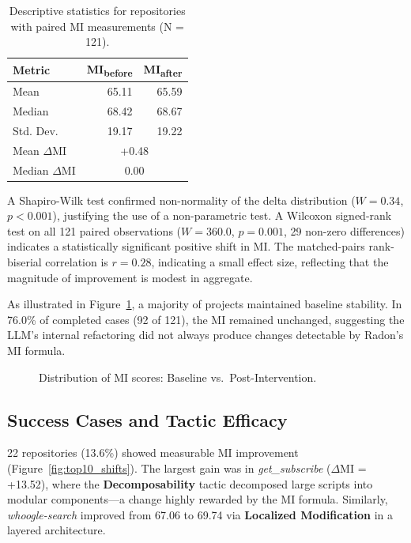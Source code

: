 \documentclass[sigconf,review,anonymous]{acmart}
\begin{document}
\begin{table}[htbp]
\caption{Descriptive statistics for repositories with paired MI measurements (N = 121).}
\label{tab:descriptive}
\centering
\small
\begin{tabular}{lrr}
\toprule
\textbf{Metric} & \textbf{MI\textsubscript{before}} & \textbf{MI\textsubscript{after}} \\
\midrule
Mean & 65.11 & 65.59 \\
Median & 68.42 & 68.67 \\
Std. Dev. & 19.17 & 19.22 \\
\midrule
Mean $\Delta$MI & \multicolumn{2}{c}{+0.48} \\
Median $\Delta$MI & \multicolumn{2}{c}{0.00} \\
\bottomrule
\end{tabular}
\end{table}

A Shapiro-Wilk test confirmed non-normality of the delta distribution ($W = 0.34$, $p < 0.001$), justifying the use of a non-parametric test. A Wilcoxon signed-rank test on all 121 paired observations ($W = 360.0$, $p = 0.001$, 29 non-zero differences) indicates a statistically significant positive shift in MI. The matched-pairs rank-biserial correlation is $r = 0.28$, indicating a small effect size, reflecting that the magnitude of improvement is modest in aggregate.

As illustrated in Figure~\ref{fig:mi_dist}, a majority of projects maintained baseline stability. In 76.0\% of completed cases (92 of 121), the MI remained unchanged, suggesting the LLM's internal refactoring did not always produce changes detectable by Radon's MI formula.

\begin{figure}[htbp]
    \centering
    \resizebox{0.5\textwidth}{!}{}
    \caption{Distribution of MI scores: Baseline vs.\ Post-Intervention.}
    \label{fig:mi_dist}
\end{figure}

\subsection{Success Cases and Tactic Efficacy}

22 repositories (13.6\%) showed measurable MI improvement (Figure~\ref{fig:top10_shifts}). The largest gain was in \textit{get\_subscribe} ($\Delta$MI = +13.52), where the \textbf{Decomposability} tactic decomposed large scripts into modular components---a change highly rewarded by the MI formula. Similarly, \textit{whoogle-search} improved from 67.06 to 69.74 via \textbf{Localized Modification} in a layered architecture.
\end{document}
